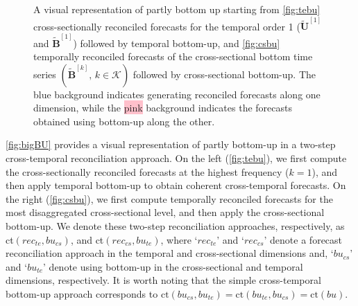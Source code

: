 \documentclass[review, 11pt]{elsarticle}
\newcommand{\Bvet}{\bm{B}}
\newcommand{\Uvet}{\bm{U}}
\theoremstyle{definition}
\begin{document}
\begin{figure}[!t]
\begin{subfigure}[b]{0.49\textwidth}
{}
		\label{fig:csbu}
	\end{subfigure}
	\vspace{-0.25cm}
	\caption{A visual representation of partly bottom up starting from \eqref{fig:tebu} cross-sectionally reconciled forecasts for the temporal order 1 ($\widetilde{\Uvet}^{[1]}$ and $\widetilde{\Bvet}^{[1]}$) followed by temporal bottom-up, and \eqref{fig:csbu} temporally reconciled forecasts of the cross-sectional bottom time series $(\widetilde{\Bvet}^{[k]}, \, k\in \mathcal{K})$ followed by cross-sectional bottom-up. The \colorbox{mybluehl}{blue} background indicates generating reconciled forecasts along one dimension, while the \colorbox{pink}{pink} background indicates the forecasts obtained using bottom-up along the other.
		}
	\label{fig:bigBU}
	\vspace*{-0.5\baselineskip}
\end{figure}

\autoref{fig:bigBU} provides a visual representation of partly bottom-up in a two-step cross-temporal reconciliation approach. On the left (\autoref{fig:tebu}), we first compute the cross-sectionally reconciled forecasts at the highest frequency ($k = 1$), and then apply temporal bottom-up to obtain coherent cross-temporal forecasts. On the right (\autoref{fig:csbu}), we first compute temporally reconciled forecasts for the most disaggregated cross-sectional level, and then apply the cross-sectional bottom-up. We denote these two-step reconciliation approaches, respectively, as ct$(rec_{te},bu_{cs})$, and ct$(rec_{cs},bu_{te})$, where ‘$rec_{te}$’ and ‘$rec_{cs}$’ denote a forecast reconciliation approach in the temporal and cross-sectional dimensions and, ‘$bu_{cs}$’ and ‘$bu_{te}$’ denote using bottom-up in the cross-sectional and temporal dimensions, respectively. It is worth noting that the simple cross-temporal bottom-up approach corresponds to $\mathrm{ct}(bu_{cs}, bu_{te})=\mathrm{ct}(bu_{te}, bu_{cs})=\mathrm{ct}(bu)$.
\end{document}
